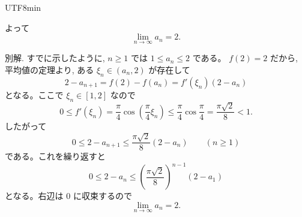 \documentclass[a4paper,12pt]{article}
\begin{document}
\begin{CJK}{UTF8}{min}
\begin{enumerate}
よって
\[
\lim_{n\to\infty}a_n=2.
\]

別解. すでに示したように, $n\ge 1$ では $1\le a_n\le 2$ である。
$f(2)=2$ だから, 平均値の定理より, ある $\xi_n\in(a_n,2)$ が存在して
\[
2-a_{n+1}=f(2)-f(a_n)=f'(\xi_n)(2-a_n)
\]
となる。ここで $\xi_n\in[1,2]$ なので
\[
0\le f'(\xi_n)
=\frac{\pi}{4}\cos\left(\frac{\pi}{4}\xi_n\right)
\le \frac{\pi}{4}\cos\frac{\pi}{4}
=\frac{\pi\sqrt2}{8}<1.
\]
したがって
\[
0\le 2-a_{n+1}\le \frac{\pi\sqrt2}{8}(2-a_n)\qquad (n\ge 1)
\]
である。これを繰り返すと
\[
0\le 2-a_n\le
\left(\frac{\pi\sqrt2}{8}\right)^{n-1}(2-a_1)
\]
となる。右辺は $0$ に収束するので
\[
\lim_{n\to\infty}a_n=2.
\]
\end{enumerate}

\ifPDFTeX
\end{CJK}
\fi
\end{document}
